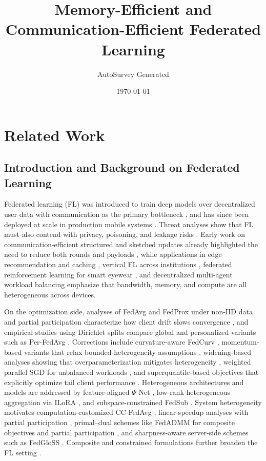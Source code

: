 \documentclass[11pt]{article}
\title{Memory-Efficient and Communication-Efficient Federated Learning}
\author{AutoSurvey Generated}
\date{\today}
\begin{document}
\maketitle

\section{Related Work}

\subsection{Introduction and Background on Federated Learning}

Federated learning (FL) was introduced to train deep models over decentralized user data with communication as the primary bottleneck \citep{mcmahan2017communication}, and has since been deployed at scale in production mobile systems \citep{bonawitz2019towards}. Threat analyses show that FL must also contend with privacy, poisoning, and leakage risks \citep{Hallaji2022FederatedAT,wei2024data}. Early work on communication-efficient structured and sketched updates already highlighted the need to reduce both rounds and payloads \citep{konevcny2016federated}, while applications in edge recommendation and caching \citep{feng2024leveraging}, vertical FL across institutions \citep{chen2020vafl}, federated reinforcement learning for smart eyewear \citep{sedghani2025federated}, and decentralized multi-agent workload balancing \citep{mohammadabadi2024communication} emphasize that bandwidth, memory, and compute are all heterogeneous across devices.

On the optimization side, analyses of FedAvg and FedProx under non-IID data and partial participation characterize how client drift slows convergence \citep{li2019convergence,su2023non}, and empirical studies using Dirichlet splits compare global and personalized variants such as Per-FedAvg \citep{reguieg2023comparative}. Corrections include curvature-aware FedCurv \citep{shoham2019overcoming}, momentum-based variants that relax bounded-heterogeneity assumptions \citep{Cheng2023MomentumBN}, widening-based analyses showing that overparameterization mitigates heterogeneity \citep{jian2025widening}, weighted parallel SGD for unbalanced workloads \citep{daning2017weighted}, and superquantile-based objectives that explicitly optimize tail client performance \citep{pillutla2024federated}. Heterogeneous architectures and models are addressed by feature-aligned \(\Psi\)-Net \citep{Yu2020HeterogeneousFL}, low-rank heterogeneous aggregation via ILoRA \citep{Zhou2025ILoRAFL}, and subspace-constrained FedSub \citep{zhang2025efficient}. System heterogeneity motivates computation-customized CC-FedAvg \citep{Zhang2022CCFedAvgCC}, linear-speedup analyses with partial participation \citep{Yang2021AchievingLS,qu2023unified}, primal--dual schemes like FedADMM for composite objectives and partial participation \citep{Wang2022FedADMMAF}, and sharpness-aware server-side schemes such as FedGloSS \citep{caldarola2025beyond}. Composite and constrained formulations further broaden the FL setting \citep{yuan2020federated}.
\end{document}
